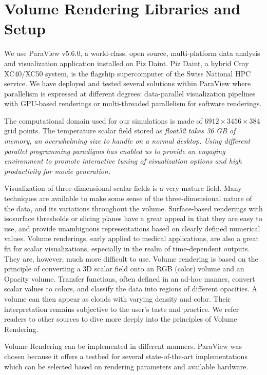 \documentclass[5p,times]{elsarticle}
\begin{document}
\section{Volume Rendering Libraries and Setup}

We use ParaView v5.6.0, a world-class, open source, multi-platform data analysis and
visualization application installed on Piz Daint. Piz Daint, a hybrid Cray XC40/XC50 system,
is the flagship supercomputer of the Swiss National HPC service. We have deployed
and tested several solutions within ParaView where parallelism is expressed
at different degrees: data-parallel visualization pipelines with GPU-based renderings
or multi-threaded parallelism for software renderings.

The computational domain  used for our simulations is made of $ 6912 \times 3456 \times 384 $ grid points.
The temperature scalar field stored as \it{float32} \rm takes 36 GB of memory, an
overwhelming size to handle on a normal desktop. Using different parallel programming
paradigms has enabled us to provide an engaging environment to promote interactive tuning of
visualization options and high productivity for movie generation.

Visualization of three-dimensional scalar fields is a very mature field. Many techniques are
available to make some sense of the three-dimensional nature of the data, and its variations
throughout the volume. Surface-based renderings with isosurface thresholds or
slicing planes have a great appeal in that they are easy to use, and provide unambiguous
representations based on clearly defined numerical values. Volume renderings, early applied
to medical applications, are also a great fit for scalar visualizations, especially in the
realm of time-dependent outputs. They are, however, much more difficult to use. Volume rendering is
based on the principle of converting a 3D scalar field onto an RGB (color) volume and an Opacity volume.
Transfer functions, often defined in an ad-hoc manner, convert scalar values to colors, and classify
the data into regions of different opacities. A volume can then appear as clouds with varying density and color.
Their interpretation remains subjective to the user's taste and practice.
We refer readers to other sources \cite{VTKTextbook} to dive more deeply into the principles of Volume Rendering.

Volume Rendering can be implemented in different manners. ParaView was chosen because it offers a testbed
for several state-of-the-art implementations which can be selected based on rendering parameters and
available hardware.
\end{document}

